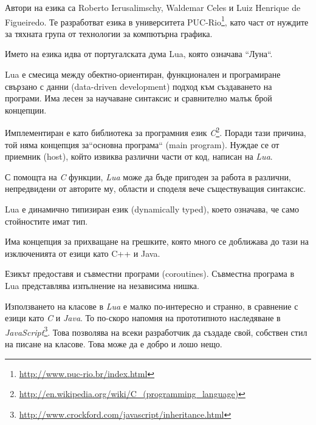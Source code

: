			Автори на езика са Roberto Ierusalimschy, Waldemar Celes и Luiz Henrique de Figueiredo. Те разработват езика в
			университета PUC-Rio\footnote{\url{http://www.puc-rio.br/index.html}}, като част от нуждите за тяхната група
			от технологии за компютърна графика. 
			
			Името на езика идва от португалската дума Lua, която означава ``Луна``.
			
			Lua е смесица между обектно-ориентиран, функционален и програмиране свързано с данни (data-driven development)
			подход към създаването на програми. Има лесен за научаване синтаксис и сравнително малък брой концепции. 
			
			Имплементиран е като библиотека за програмния език \emph{C}\footnote{\url{http://en.wikipedia.org/wiki/C_(programming_language)}}. 
			Поради тази причина, той няма концепция за``основна програма`` (main program). Нуждае се от приемник (host), който извиква различни
			части от код, написан на \emph{Lua}.
			
			С помощта на \emph{C} функции, \emph{Lua} може да бъде пригоден за работа в различни, непредвидени от авторите му,
			области и споделя вече съществуващия синтаксис.
			
				Lua е динамично типизиран език (dynamically typed), което означава, че само стойностите имат тип.
				
								
				
				
				Има концепция за прихващане на грешките, която много се доближава до тази на изключенията от езици като
				C++ и Java.
				
				
								
				
				Езикът предоставя и съвместни програми (coroutines). Съвместна програма в Lua представлява изпълнение на независима нишка.
				
				
				
								
				
				Използването на класове в \emph{Lua} е малко по-интересно и странно, в сравнение с езици като \emph{C} и \emph{Java}. 
				То по-скоро напомня на прототипното наследяване в
				\emph{JavaScript}\footnote{\url{http://www.crockford.com/javascript/inheritance.html}}.
				Това позволява на всеки разработчик да създаде свой, собствен стил на писане на класове. Това може да е добро и лошо нещо.
				
